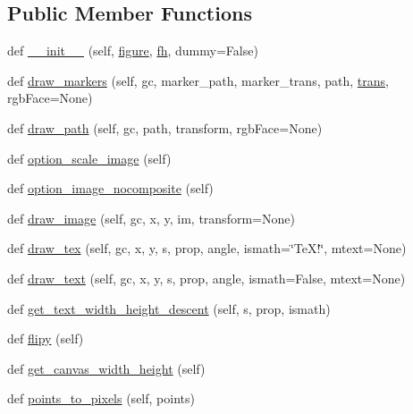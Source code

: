 \subsection*{Public Member Functions}
\begin{DoxyCompactItemize}
\item 
def \hyperlink{classmatplotlib_1_1backends_1_1backend__pgf_1_1RendererPgf_a2a9e0ea44ccbc918897ad16033cc6738}{\+\_\+\+\_\+init\+\_\+\+\_\+} (self, \hyperlink{classmatplotlib_1_1backends_1_1backend__pgf_1_1RendererPgf_a485a85245a232fc23e71ab5bd7525db7}{figure}, \hyperlink{classmatplotlib_1_1backends_1_1backend__pgf_1_1RendererPgf_ab5681d558cdb788f9ad47df9b7a26c47}{fh}, dummy=False)
\item 
def \hyperlink{classmatplotlib_1_1backends_1_1backend__pgf_1_1RendererPgf_af5e0bd81e35f5d5c616d0471d6f2e5f8}{draw\+\_\+markers} (self, gc, marker\+\_\+path, marker\+\_\+trans, path, \hyperlink{size_2foo_8f90_afabfd8da71309850231a00e53c61f106}{trans}, rgb\+Face=None)
\item 
def \hyperlink{classmatplotlib_1_1backends_1_1backend__pgf_1_1RendererPgf_afbf16877f4484d1b3659d051767382e1}{draw\+\_\+path} (self, gc, path, transform, rgb\+Face=None)
\item 
def \hyperlink{classmatplotlib_1_1backends_1_1backend__pgf_1_1RendererPgf_ad61fc620e9c00b2d5e28d845f71e2344}{option\+\_\+scale\+\_\+image} (self)
\item 
def \hyperlink{classmatplotlib_1_1backends_1_1backend__pgf_1_1RendererPgf_ae61ec1232737796ec392662912a588a7}{option\+\_\+image\+\_\+nocomposite} (self)
\item 
def \hyperlink{classmatplotlib_1_1backends_1_1backend__pgf_1_1RendererPgf_aa4284845d72b2ab1a94616945180d92b}{draw\+\_\+image} (self, gc, x, y, im, transform=None)
\item 
def \hyperlink{classmatplotlib_1_1backends_1_1backend__pgf_1_1RendererPgf_ad6e62a95eeacf2cde567a28709841206}{draw\+\_\+tex} (self, gc, x, y, s, prop, angle, ismath=\char`\"{}Te\+X!\char`\"{}, mtext=None)
\item 
def \hyperlink{classmatplotlib_1_1backends_1_1backend__pgf_1_1RendererPgf_acb314f9cd208c195b87660462e78e318}{draw\+\_\+text} (self, gc, x, y, s, prop, angle, ismath=False, mtext=None)
\item 
def \hyperlink{classmatplotlib_1_1backends_1_1backend__pgf_1_1RendererPgf_a6294690c846ac7101e526b02fb203644}{get\+\_\+text\+\_\+width\+\_\+height\+\_\+descent} (self, s, prop, ismath)
\item 
def \hyperlink{classmatplotlib_1_1backends_1_1backend__pgf_1_1RendererPgf_a0f183c20f93ea059ee3b9d34f81a9fa8}{flipy} (self)
\item 
def \hyperlink{classmatplotlib_1_1backends_1_1backend__pgf_1_1RendererPgf_a222a1158bb597beb9347b08aca50c884}{get\+\_\+canvas\+\_\+width\+\_\+height} (self)
\item 
def \hyperlink{classmatplotlib_1_1backends_1_1backend__pgf_1_1RendererPgf_ae8c3c56a56ff7dd1b61dc8224dd83e4a}{points\+\_\+to\+\_\+pixels} (self, points)
\end{DoxyCompactItemize}
